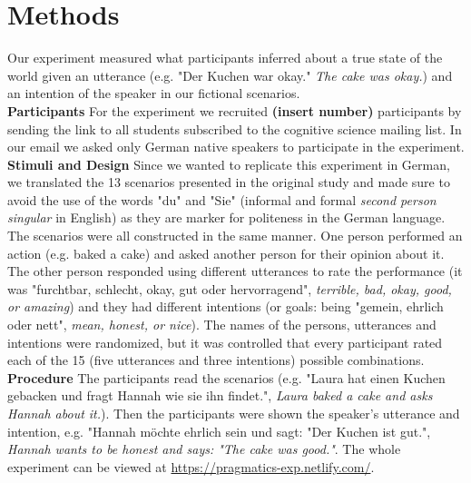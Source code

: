 \documentclass[a4paper,11pt]{article}
\begin{document}
\section{Methods}
Our experiment measured what participants inferred about a true state of the world given an utterance (e.g. "Der Kuchen war okay." \textit{The cake was okay.}) and an intention of the speaker in our fictional scenarios. \\
\textbf{Participants} For the experiment we recruited \textbf{(insert number)} participants by sending the link to all students subscribed to the cognitive science mailing list. In our email we asked only German native speakers to participate in the experiment.\\
\textbf{Stimuli and Design} Since we wanted to replicate this experiment in German, we translated the 13 scenarios presented in the original study and made sure to avoid the use of the words "du" and "Sie" (informal and formal \textit{second person singular} in English) as they are marker for politeness in the German language. The scenarios were all constructed in the same manner. One person performed an action (e.g. baked a cake) and asked another person for their opinion about it. The other person responded using different utterances to rate the performance (it was "furchtbar, schlecht, okay, gut oder hervorragend", \textit{terrible, bad, okay, good, or amazing}) and they had different intentions (or goals: being "gemein, ehrlich oder nett", \textit{mean, honest, or nice}). The names of the persons, utterances and intentions were randomized, but it was controlled that every participant rated each of the 15 (five utterances and three intentions) possible combinations.\\
\textbf{Procedure} The participants read the scenarios (e.g. "Laura hat einen Kuchen gebacken und fragt Hannah wie sie ihn findet.", \textit{Laura baked a cake and asks Hannah about it.}). Then the participants were shown the speaker's utterance and intention, e.g. "Hannah möchte ehrlich sein und sagt: "Der Kuchen ist gut.", \textit{Hannah wants to be honest and says: "The cake was good."}. The whole experiment can be viewed at \url{https://pragmatics-exp.netlify.com/}. 
\end{document}
